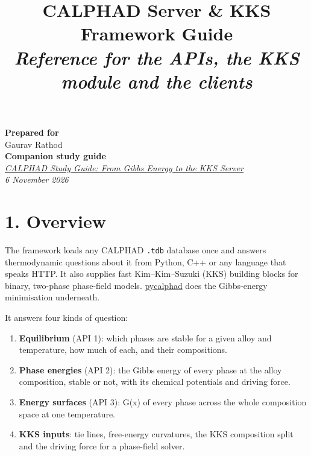 \documentclass[12pt,a4paper]{article}
\title{\textbf{CALPHAD Server \& KKS Framework Guide} \\ \vspace{0.3cm} \textit{Reference for the APIs, the KKS module and the clients} \\}
\author{}
\date{}
\begin{document}
\maketitle
\vspace{-1.5cm}
\begin{center}
    \large{\textbf{Prepared for} \\ Gaurav Rathod \\}
    \vspace{1cm}
    \large{\textbf{Companion study guide} \\ \href{https://claude.ai/artifact/RqGi3rQfcCsymzPJJ1DiAa}{\textit{CALPHAD Study Guide: From Gibbs Energy to the KKS Server}} \\}
    \vspace{1cm}
    \textit{6 November 2026} \\
\end{center}

\pagebreak
\tableofcontents

\newpage
{}


\section*{1. Overview}
The framework loads any CALPHAD \texttt{.\allowbreak{}tdb} database once and answers thermodynamic questions about it from Python, C++ or any language that speaks HTTP. It also supplies fast Kim--Kim--Suzuki (KKS) building blocks for binary, two-phase phase-field models. \href{https://pycalphad.org}{pycalphad} does the Gibbs-energy minimisation underneath.

It answers four kinds of question:

\begin{enumerate}
\item \textbf{Equilibrium} (API 1): which phases are stable for a given alloy and temperature, how much of each, and their compositions.
\item \textbf{Phase energies} (API 2): the Gibbs energy of every phase at the alloy composition, stable or not, with its chemical potentials and driving force.
\item \textbf{Energy surfaces} (API 3): G(x) of every phase across the whole composition space at one temperature.
\item \textbf{KKS inputs}: tie lines, free-energy curvatures, the KKS composition split and the driving force for a phase-field solver.
\end{enumerate}
\end{document}
